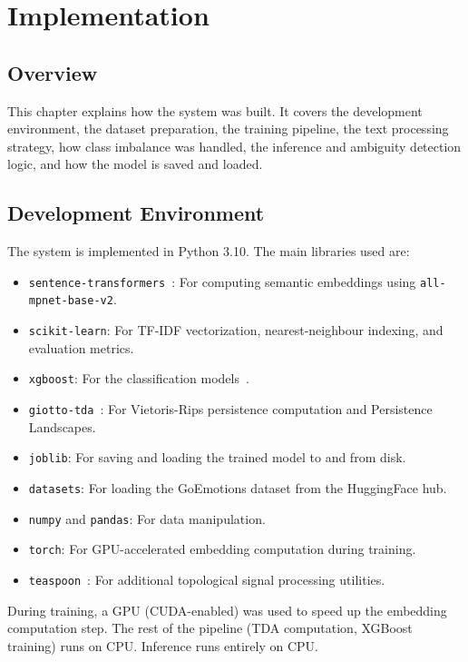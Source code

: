 \chapter{Implementation}

\section{Overview}

This chapter explains how the system was built. It covers the development environment, the
dataset preparation, the training pipeline, the text processing strategy, how class imbalance was
handled, the inference and ambiguity detection logic, and how the model is saved and loaded.

\section{Development Environment}

The system is implemented in Python 3.10. The main libraries used are:

\begin{itemize}
    \item \texttt{sentence-transformers}~\cite{sentence_bert}: For computing semantic embeddings using
    \texttt{all-mpnet-base-v2}.
    \item \texttt{scikit-learn}: For TF-IDF vectorization, nearest-neighbour indexing, and
    evaluation metrics.
    \item \texttt{xgboost}: For the classification models~\cite{xgboost_emotion}.
    \item \texttt{giotto-tda}~\cite{giotto}: For Vietoris-Rips persistence computation and Persistence
    Landscapes.
    \item \texttt{joblib}: For saving and loading the trained model to and from disk.
    \item \texttt{datasets}: For loading the GoEmotions dataset from the HuggingFace hub.
    \item \texttt{numpy} and \texttt{pandas}: For data manipulation.
    \item \texttt{torch}: For GPU-accelerated embedding computation during training.
    \item \texttt{teaspoon}~\cite{teaspoon}: For additional topological signal processing utilities.
\end{itemize}

During training, a GPU (CUDA-enabled) was used to speed up the embedding computation step.
The rest of the pipeline (TDA computation, XGBoost training) runs on CPU. Inference runs
entirely on CPU.

